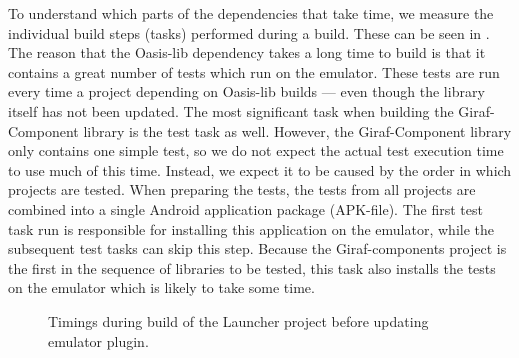 To understand which parts of the dependencies that take time, we measure the individual build steps (tasks) performed during a build. These can be seen in . The reason that the Oasis-lib dependency takes a long time to build is that it contains a great number of tests which run on the emulator. These tests are run every time a project depending on Oasis-lib builds --- even though the library itself has not been updated. The most significant task when building the Giraf-Component library is the test task as well. However, the Giraf-Component library only contains one simple test, so we do not expect the actual test execution time to use much of this time. Instead, we expect it to be caused by the order in which projects are tested. When preparing the tests, the tests from all projects are combined into a single Android application package (APK-file). The first test task run is responsible for installing this application on the emulator, while the subsequent test tasks can skip this step. Because the Giraf-components project is the first in the sequence of libraries to be tested, this task also installs the tests on the emulator which is likely to take some time.
\begin{figure}
\centering
{}
\caption{Timings during build of the Launcher project before updating emulator plugin.}\label{fig:launcher_build_times_1}
\end{figure}

